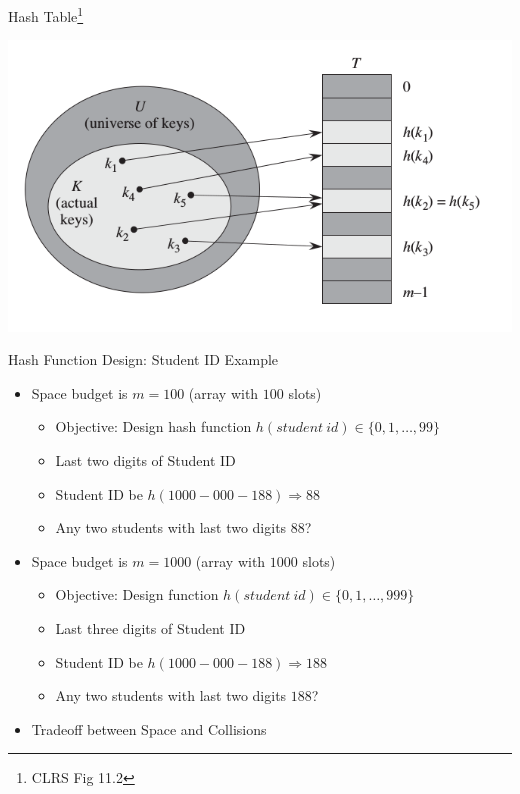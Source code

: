 \documentclass{beamer}
\begin{document}
\begin{frame}{Hash Table\footnote{CLRS Fig 11.2}}
    \begin{center}
        \includegraphics[scale=0.5]{hashTableAbstract.png}
    \end{center}
\end{frame}

\begin{frame}{Hash Function Design: Student ID Example}
    \begin{itemize}
        \item Space budget is $m=100$ (array with $100$ slots) 
        \begin{itemize}
            \item Objective: Design hash function $h(student\ id) \in \{0, 1, \ldots, 99\}$ 
            \item Last two digits of Student ID
            \item Student ID be $h(1000-000-188) \Rightarrow 88$ 
            \item Any two students with last two digits $88$?
        \end{itemize} 
        \item Space budget is $m=1000$ (array with $1000$ slots) 
        \begin{itemize}
            \item Objective: Design function $h(student\ id) \in \{0, 1, \ldots, 999\}$ 
            \item Last three digits of Student ID
            \item Student ID be $h(1000-000-188) \Rightarrow 188$ 
            \item Any two students with last two digits $188$?
        \end{itemize} 
        \item Tradeoff between Space and Collisions
    \end{itemize}
\end{frame}
\end{document}
